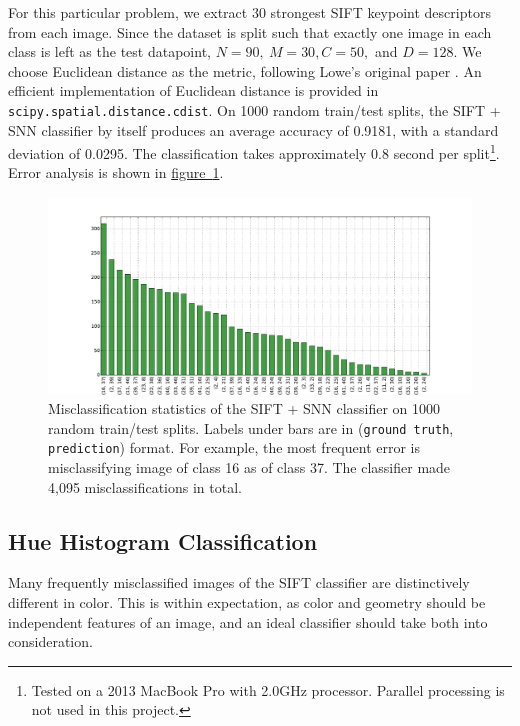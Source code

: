 \documentclass[11pt,a4paper]{article}
\begin{document}
For this particular problem, we extract 30 strongest SIFT keypoint descriptors from each image. Since the dataset is split such that exactly one image in each class is left as the test datapoint, $N=90,\ M=30, C=50,$ and $D=128.$ We choose Euclidean distance as the metric, following Lowe's original paper \cite{lowe1999object}. An efficient implementation of Euclidean distance is provided in \texttt{scipy.spatial.distance.cdist}. On 1000 random train/test splits, the SIFT + SNN classifier by itself produces an average accuracy of 0.9181, with a standard deviation of 0.0295. The classification takes approximately 0.8 second per split\footnote{Tested on a 2013 MacBook Pro with 2.0GHz processor. Parallel processing is not used in this project.}. Error analysis is shown in \hyperref[fig:sift_error]{figure~\ref{fig:sift_error}}.

\begin{figure}[htbp]
\centering
\includegraphics[scale=0.5]{sift_error.pdf}
\caption{Misclassification statistics of the SIFT + SNN classifier on 1000 random train/test splits. Labels under bars are in (\texttt{ground truth}, \texttt{prediction}) format. For example, the most frequent error is misclassifying image of class 16 as of class 37. The classifier made 4,095 misclassifications in total.}
\label{fig:sift_error}
\end{figure}

\subsection{Hue Histogram Classification}
\label{sec:hue_hist}

Many frequently misclassified images of the SIFT classifier are distinctively different in color. This is within expectation, as color and geometry should be independent features of an image, and an ideal classifier should take both into consideration.
\end{document}
